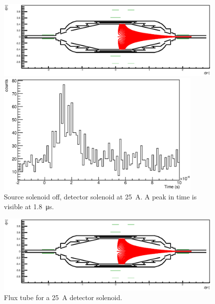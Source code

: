 \begin{figure}[H]
\centering

		\centerline{\includegraphics[width = 1.3\linewidth]{graphics/analysis/monSpec/fieldSimulation/AB.eps} }
	
	\caption[Asymmetric field \SI{50}{\ampere}]{Flux tube for a \SI{50}{\ampere} detector solenoid, \SI{-8}{\ampere} outer central air coil current.}
	\label{fig:ABf}

\centering
	\includegraphics[width = 0.9\textwidth]{graphics/analysis/monSpec/AB.eps}
	\caption[\SI{50}{\ampere} loops]{Source solenoid off, detector solenoid at \SI{25}{\ampere}. A peak in time is visible at \SI{1.8}{\micro\second}. }
	\label{fig:AB}
\end{figure}

\clearpage

\begin{figure}[H]
\centering
			\centerline{\includegraphics[width = 1.3\linewidth]{graphics/analysis/monSpec/fieldSimulation/AA.eps}}
	
	\caption[\SI{25}{\ampere} asymmetric]{Flux tube for a \SI{25}{\ampere} detector solenoid.}
	\label{fig:AAf}
\end{figure}

